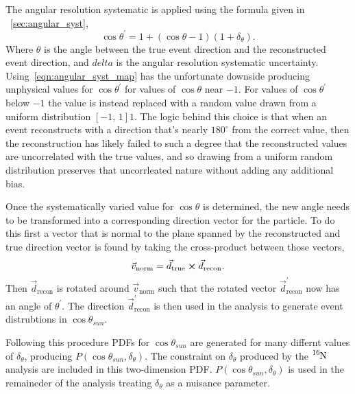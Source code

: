 The angular resolution systematic is applied using the formula given in
~\ref{sec:angular_syst},
\begin{equation}
    \cos\theta^{\prime} = 1 + (\cos\theta - 1)(1+\delta_{\theta})\text{.}
    \label{eqn:angular_syst_map}
\end{equation}
Where $\theta$ is the angle between the true event direction and the reconstructed
event direction, and $delta$ is the angular resolution systematic uncertainty.
Using~\eqref{eqn:angular_syst_map} has the unfortunate downside producing
unphysical values for $\cos\theta^{\prime}$ for values of $\cos\theta$ near
$-1$. For values of $\cos\theta^{\prime}$ below $-1$ the value is instead replaced
with a random value drawn from a uniform distribution $\left[-1\text{, }1\right]1$.
The logic behind this choice is that when an event reconstructs with a direction
that's nearly $180^{\circ}$ from the correct value, then the reconstruction
has likely failed to such a degree that the reconstructed values are uncorrelated
with the true values, and so drawing from a uniform random distribution preserves
that uncorrleated nature without adding any additional bias.

Once the systematically varied value for $\cos\theta$ is determined, the new angle
needs to be transformed into a corresponding direction vector for the particle.
To do this first a vector that is normal to the plane spanned by the reconstructed
and true direction vector is found by taking the cross-product between those vectors,
\begin{equation}
    \vec{v}_{\mathrm{norm}} = \vec{d}_{\mathrm{true}} \cross \vec{d}_{\mathrm{recon}}\text{.}
\end{equation}
Then $\vec{d}_{\mathrm{recon}}$ is rotated around $\vec{v}_{\mathrm{norm}}$
such that the rotated vector $\vec{d}^{\prime}_{\mathrm{recon}}$ now has an angle
of $\theta^{\prime}$.
The direction $\vec{d}^{\prime}_{\mathrm{recon}}$ is then used in the
analysis to generate event distrubtions in $\cos\theta_{sun}$.

Following this procedure PDFs for $\cos\theta_{sun}$ are generated for many differnt
values of $\delta_{\theta}$, producing $P(\cos\theta_{sun}, \delta_{\theta})$.
The constraint on $\delta_{\theta}$ produced by the $\ce{^{16}N}$ analysis
are included in this two-dimension PDF\@.
$P(\cos\theta_{sun}, \delta_{\theta})$ is used in the remaineder of the analysis
treating $\delta_{\theta}$ as a nuisance parameter.

